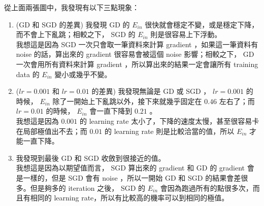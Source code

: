 \documentclass[12pt,a4paper]{article}
\theoremstyle{remark}
\begin{document}
從上面兩張圖中，我發現有以下三點現象：
\begin{enumerate}
	\item (GD 和 SGD 的差異) 我發現 GD 的 $E_{in}$ 很快就會穩定不變，或是穩定下降，而不會上下亂跳；相較之下， SGD 的 $E_{in}$ 則是很容易上下浮動。 \\
	我想這是因為 SGD 一次只會取一筆資料來計算 gradient ，如果這一筆資料有 noise 的話，算出來的 gradient 很容易會被這個 noise 影響；相較之下， GD 一次會用所有資料來計算 gradient ，所以算出來的結果一定會讓所有 training data 的 $E_{in}$ 變小或幾乎不變。
	\item ($lr = 0.001$ 和 $lr = 0.01$ 的差異) 我發現無論是 GD 或 SGD ， $lr = 0.001$ 的時候， $E_{in}$ 除了一開始上下亂跳以外，接下來就幾乎固定在 $0.46$ 左右了；而 $lr = 0.01$ 的時候， $E_{in}$ 會一直下降到 $0.21$ 。 \\
	我想這是因為 $0.001$ 的 learning rate 太小了，下降的速度太慢，甚至很容易卡在局部極值出不去；而 $0.01$ 的 learning rate 則是比較洽當的值，所以 $E_{in}$ 才能一直下降。
	\item 我發現到最後 GD 和 SGD 收斂到很接近的值。\\
	我想這是因為以期望值而言， SGD 算出來的 gradient 和 GD 的 gradient 會是一樣的，但是 SGD 會有 noise ，所以一開始 GD 和 SGD 的結果會差很多。但是夠多的 iteration 之後， SGD 的 $E_{in}$ 會因為跑過所有的點很多次，而且有相同的 learning rate，所以有比較高的機率可以到相同的極值。
\end{enumerate}
\end{document}
